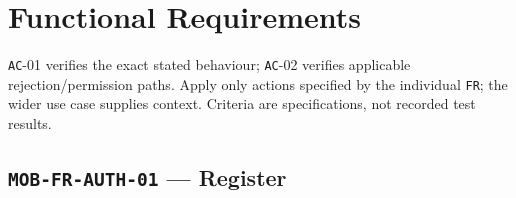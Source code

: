 \clearpage
\section{Functional Requirements}\label{sec:srs-9}
\texttt{AC}-01 verifies the exact stated behaviour; \texttt{AC}-02 verifies applicable rejection/\allowbreak{}permission paths. Apply only actions specified by the individual \texttt{FR}; the wider use case supplies context. Criteria are specifications, not recorded test results.

\subsection{\texttt{MOB-\allowbreak{}FR-\allowbreak{}AUTH-\allowbreak{}01} — Register}
\begingroup
\fontsize{9.5}{12}\selectfont
\setlength{\SRSWidth}{\dimexpr\linewidth-2\tabcolsep\relax}
